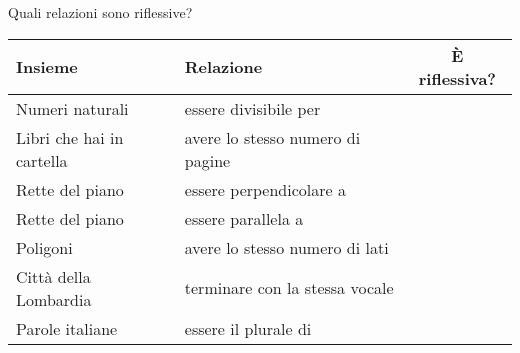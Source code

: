 \begin{comment}
\begin{inaccessibleblock}[Figura: TODO]
 \begin{figure}[t]
\begin{minipage}[b]{.69\textwidth}
 \centering
 
 \caption{Esercizio \ref{ese:B.14}.}\label{fig:B.15}
\end{minipage}\
\begin{minipage}[b]{.3\textwidth}
 \centering
 
 \caption{Esercizio \ref{ese:B.18}.}\label{fig:B.16}
\end{minipage}
\end{figure}
\end{inaccessibleblock}


\end{comment}


\begin{esercizio}
\label{ese:B.19}
Quali relazioni sono riflessive?
\begin{center}
\begin{tabular}{llc}
\toprule
Insieme & Relazione & È riflessiva?\\
\midrule
Numeri naturali & essere divisibile per & 
 \boxSi\quad\boxNo \\
Libri che hai in cartella & avere lo stesso numero di pagine & 
 \boxSi\quad\boxNo \\
Rette del piano & essere perpendicolare a & 
 \boxSi\quad\boxNo \\
Rette del piano & essere parallela a & 
 \boxSi\quad\boxNo \\
Poligoni & avere lo stesso numero di lati & 
 \boxSi\quad\boxNo \\
Città della Lombardia & terminare con la stessa vocale & 
 \boxSi\quad\boxNo \\
Parole italiane & essere il plurale di & 
 \boxSi\quad\boxNo \\
\bottomrule
\end{tabular}
\end{center}
\end{esercizio}

